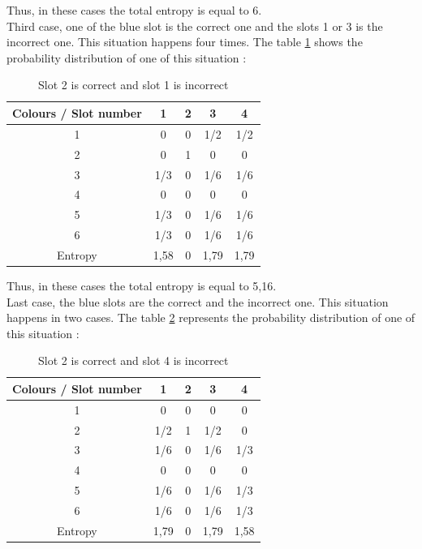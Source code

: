 \documentclass[titlepage]{article}
\begin{document}
Thus, in these cases the total entropy is equal to 6. \\

Third case, one of the blue slot is the correct one and the slots 1 or 3 is the incorrect one. This situation happens four times. The table \ref{tab:case3} shows the probability distribution of one of this situation : 

\begin{table}[h!]
\centering
\begin{tabular}{|c|c|c|c|c|}
        \hline
        Colours / Slot number & 1 & 2 & 3 & 4 \\ 
        \hline
        1 & 0 & 0 & 1/2 & 1/2 \\
        \hline
        2 & 0 & 1 & 0 & 0\\
        \hline
        3 & 1/3 & 0 & 1/6 & 1/6\\
        \hline
        4 & 0 & 0 & 0 & 0 \\
        \hline
        5 & 1/3 & 0 & 1/6 & 1/6\\
        \hline
        6 & 1/3 & 0 & 1/6 & 1/6 \\
        \hline
        Entropy & 1,58 & 0 & 1,79 & 1,79\\
        \hline
\end{tabular}
\caption{Slot 2 is correct and slot 1 is incorrect}
\label{tab:case3}
\end{table}

Thus, in these cases the total entropy is equal to 5,16. \\

Last case, the blue slots are the correct and the incorrect one. This situation happens in two cases. The table \ref{tab:case4} represents the probability distribution of one of this situation : 

\begin{table}[h!]
\centering
\begin{tabular}{|c|c|c|c|c|}
        \hline
        Colours / Slot number & 1 & 2 & 3 & 4 \\ 
        \hline
        1 & 0 & 0 & 0 & 0 \\
        \hline
        2 & 1/2 & 1 & 1/2 & 0\\
        \hline
        3 & 1/6 & 0 & 1/6 & 1/3\\
        \hline
        4 & 0 & 0 & 0 & 0 \\
        \hline
        5 & 1/6 & 0 & 1/6 & 1/3\\
        \hline
        6 & 1/6 & 0 & 1/6 & 1/3 \\
        \hline
        Entropy & 1,79 & 0 & 1,79 & 1,58\\
        \hline
\end{tabular}
\caption{Slot 2 is correct and slot 4 is incorrect}
\label{tab:case4}
\end{table}
\end{document}
